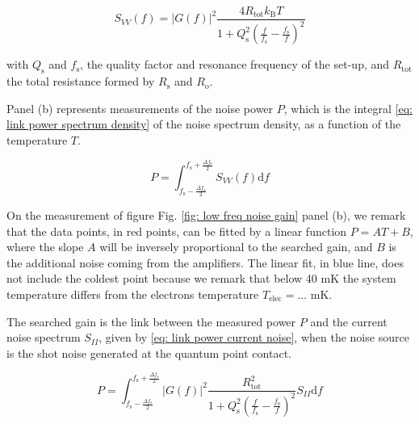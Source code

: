 \begin{equation}
S_{VV}\left(f\right) = \left|G\left(f\right)\right|^{2}\frac{4R_{\mathrm{tot}}k_{\mathrm{B}}T}{1+Q_{\mathrm{s}}^{2}\left(\frac{f}{f_{\mathrm{s}}}-\frac{f_{\mathrm{s}}}{f}\right)^{2}} \label{eq: thermal spectrum density}
\end{equation}

with $Q_{\mathrm{s}}$ and $f_{\mathrm{s}}$, the quality factor and resonance frequency of the set-up, and $R_{\mathrm{tot}}$ the total resistance formed by $R_{\mathrm{s}}$ and $R_{\mathrm{o}}$.

Panel (b) represents measurements of the noise power $P$, which is the integral \eqref{eq: link power spectrum density} of the noise spectrum density, as a function of the temperature $T$.

\begin{equation}
P = \int_{f_{\mathrm{s}}-\frac{\Delta f_{\mathrm{s}}}{2}}^{f_{\mathrm{s}}+\frac{\Delta f_{\mathrm{s}}}{2}} S_{VV}\left(f\right)\mathrm{d}f \label{eq: link power spectrum density}
\end{equation}

On the measurement of figure Fig. \ref{fig: low freq noise gain} panel (b), we remark that the data points, in red points, can be fitted by a linear function $P = AT+B$, where the slope $A$ will be inversely proportional to the searched gain, and $B$ is the additional noise coming from the amplifiers.
The linear fit, in blue line, does not include the coldest point because we remark that below 40 mK the system temperature differs from the electrons temperature $T_{\mathrm{elec}} = ...$ mK.

The searched gain is the link between the measured power $P$ and the current noise spectrum $S_{II}$, given by \eqref{eq: link power current noise}, when the noise source is the shot noise generated at the quantum point contact.

\begin{equation}
P = \int_{f_{\mathrm{s}}-\frac{\Delta f_{\mathrm{s}}}{2}}^{f_{\mathrm{s}}+\frac{\Delta f_{\mathrm{s}}}{2}}\left|G\left(f\right)\right|^{2}\frac{R_{\mathrm{tot}}^{2}}{1+Q_{\mathrm{s}}^{2}\left(\frac{f}{f_{\mathrm{s}}}-\frac{f_{\mathrm{s}}}{f}\right)^{2}}S_{II}\mathrm{d}f \label{eq: link power current noise}
\end{equation}

